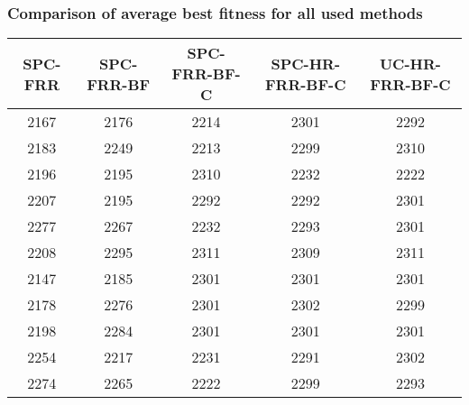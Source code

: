 \documentclass{article}
\begin{document}
\subsubsection{Comparison of average best fitness for all used methods}

\begin{table}[htb]\centering
\begin{tabular}{c|c|c|c|c}
\hline
	\multicolumn{1}{c}{\textbf{SPC-FRR}} & \multicolumn{1}{c}{\textbf{SPC-FRR-BF}} & \multicolumn{1}{c}{\textbf{SPC-FRR-BF-C}} & \multicolumn{1}{c}{\textbf{SPC-HR-FRR-BF-C}} & \multicolumn{1}{c}{\textbf{UC-HR-FRR-BF-C}} \\ \hline
   	 \multicolumn{1}{c}{2167} &	\multicolumn{1}{c}{2176} &	\multicolumn{1}{c}{2214} &	\multicolumn{1}{c}{2301} &	\multicolumn{1}{c}{2292}  \\ \hline 
	\multicolumn{1}{c}{2183} &	\multicolumn{1}{c}{2249} &	\multicolumn{1}{c}{2213} &	\multicolumn{1}{c}{2299} &	\multicolumn{1}{c}{2310}  \\ \hline 
	\multicolumn{1}{c}{2196} &	\multicolumn{1}{c}{2195} &	\multicolumn{1}{c}{2310} &	\multicolumn{1}{c}{2232} &	\multicolumn{1}{c}{2222}  \\ \hline 
	\multicolumn{1}{c}{2207} &	\multicolumn{1}{c}{2195} &	\multicolumn{1}{c}{2292} &	\multicolumn{1}{c}{2292} &	\multicolumn{1}{c}{2301}  \\ \hline 
	\multicolumn{1}{c}{2277} &	\multicolumn{1}{c}{2267} &	\multicolumn{1}{c}{2232} &	\multicolumn{1}{c}{2293} &	\multicolumn{1}{c}{2301}  \\ \hline 
	\multicolumn{1}{c}{2208} &	\multicolumn{1}{c}{2295} &	\multicolumn{1}{c}{2311} &	\multicolumn{1}{c}{2309} &	\multicolumn{1}{c}{2311}  \\ \hline 
	\multicolumn{1}{c}{2147} &	\multicolumn{1}{c}{2185} &	\multicolumn{1}{c}{2301} &	\multicolumn{1}{c}{2301} &	\multicolumn{1}{c}{2301}  \\ \hline 
	\multicolumn{1}{c}{2178} &	\multicolumn{1}{c}{2276} &	\multicolumn{1}{c}{2301} &	\multicolumn{1}{c}{2302} &	\multicolumn{1}{c}{2299}  \\ \hline 
	\multicolumn{1}{c}{2198} &	\multicolumn{1}{c}{2284} &	\multicolumn{1}{c}{2301} &	\multicolumn{1}{c}{2301} &	\multicolumn{1}{c}{2301}  \\ \hline 
	\multicolumn{1}{c}{2254} &	\multicolumn{1}{c}{2217} &	\multicolumn{1}{c}{2231} &	\multicolumn{1}{c}{2291} &	\multicolumn{1}{c}{2302}  \\ \hline 
	\multicolumn{1}{c}{2274} &	\multicolumn{1}{c}{2265} &	\multicolumn{1}{c}{2222} &	\multicolumn{1}{c}{2299} &	\multicolumn{1}{c}{2293}  \\ \hline 

\end{tabular}
\end{table}
\end{document}
